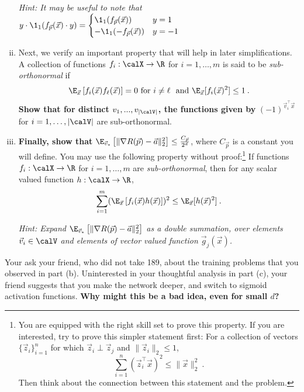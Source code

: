 \documentclass[preview]{standalone}
\begin{document}
\begin{Parts}
\begin{enumerate}[(i)]
\emph{Hint: It may be useful to note that $y\cdot\1_1(f_{\vec{p}}(\vec x)\cdot y) = \begin{cases} \1_1(f_{\vec{p}}(\vec x)) & y = 1\\ -\1_1(-f_{\vec{p}}(\vec x)) & y = -1 \end{cases} $} 




\item 
Next, we verify an important property that will help in later simplifications. A collection of functions $f_i:\calX\to\R$ for $i=1,\dots,m$ is said to be \emph{sub-orthonormal} if
\[\E_{\vec x}\left[f_i(\vec x)f_\ell(\vec x)\right]=0~\text{for}~i\neq\ell~~\text{and}~\E_{\vec x}[f_i(\vec x)^2]\leq1\:.\]
{\bf Show that for distinct $v_1, ..., v_{|\calV|}$, the functions given by} $(-1)^{\vec v_i^\top \vec x}$ for $i=1,\dots,|\calV|$ are sub-orthonormal.



\item {\bf Finally, show that} $\E_{\vec v_*}\left[\|\nabla R(\vec p) - \vec a\|_2^2\right] \leq \frac{C_{\vec p}}{2^d}$, where $C_{\vec p}$ is a constant you will define. You may use the following property without proof:\footnote{
	You are equipped with the right skill set to prove this property.
	If you are interested, try to prove this simpler statement first: For a collection of vectors $\{\vec z_i\}_{i=1}^n$ for which $\vec z_i\perp\vec z_j$ and $\|\vec z_i\|_2\leq 1$,
	\[\sum_{i=1}^n (\vec z_i^\top \vec x)^2 
	\leq \|\vec x\|_2^2\:.\]
	Then think about the connection between this statement and the problem.
} If functions $f_i:\calX\to\R$ for $i=1,\dots,m$ are \emph{sub-orthonormal}, then for any scalar valued function $h:\calX\to\R$,
\[\sum_{i=1}^{m}(\E_{\vec x}\left[f_i(\vec x)h(\vec x)\right])^{2} \leq \E_{\vec x}[h(\vec x)^2]\:.\]

\emph{Hint: Expand $\E_{\vec v_*}\left[\|\nabla R(\vec p) - \vec a\|_2^2\right]$ as a double summation, over elements $\vec v_i\in\calV$ and elements of vector valued function $\vec g_j(\vec x)$.}


\end{enumerate}

\Part Your ask your friend, who did not take 189, about the training problems that you observed in part (b). Uninterested in your thoughtful analysis in part (c), your friend suggests that you make the network deeper, and switch to sigmoid activation functions. {\bf Why might this be a bad idea, even for small $d$?} 



\end{Parts}
\end{document}
